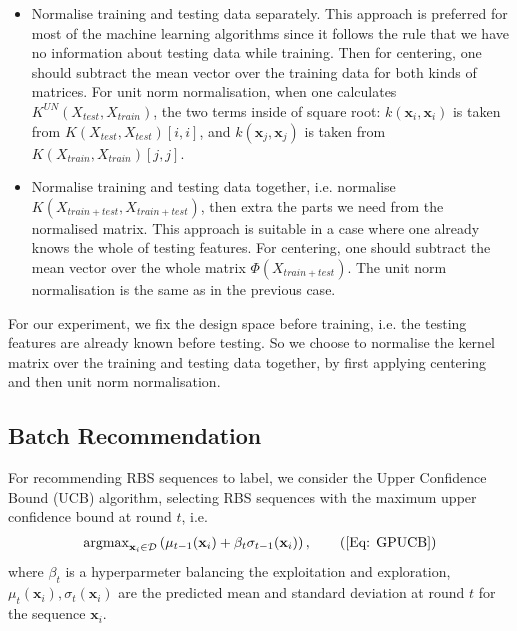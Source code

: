 \begin{itemize}
    \item Normalise training and testing data separately.
    This approach is preferred for most of the machine learning algorithms since it follows the rule that we have no information about testing data while training.
    Then for centering, one should subtract the mean vector over the training data for both kinds of matrices.
    For unit norm normalisation, when one calculates $K^{UN}(X_{test}, X_{train})$, the two terms inside of square root: $k(\mathbf{x}_i, \mathbf{x}_i)$ is taken from $K(X_{test}, X_{test})[i,i]$, and $k(\mathbf{x}_j, \mathbf{x}_j)$ is taken from $K(X_{train}, X_{train})[j,j]$.
    
    \item Normalise training and testing data together, i.e. normalise $K(X_{train+test}, X_{train+test})$, then extra the parts we need from the normalised matrix. 
    This approach is suitable in a case where one already knows the whole of testing features. 
    For centering, one should subtract the mean vector over the whole matrix $\Phi(X_{train+test})$. 
    The unit norm normalisation is the same as in the previous case. 
\end{itemize}

For our experiment, we fix the design space before training, i.e. the testing features are already known before testing. 
So we choose to normalise the kernel matrix over the training and testing data together,
by first applying centering and then unit norm normalisation. 

\subsection{Batch Recommendation}

For recommending RBS sequences to label, we consider the Upper Confidence Bound (UCB) algorithm, 
selecting RBS sequences with the maximum upper confidence bound at round $t$, i.e.
\begin{align}
    \operatorname{argmax}_{\mathbf{x}_i \in \mathcal{D}} \left( \mu_{t-1}(\mathbf{x}_i) + \beta_t \sigma_{t-1}(\mathbf{x}_i)\right),
    \tag{\ref{Eq: GPUCB}}
\end{align}
where $\beta_t$ is a hyperparmeter balancing the exploitation and exploration, 
$\mu_t(\mathbf{x}_i), \sigma_t(\mathbf{x}_i)$ are the predicted mean and standard deviation at round $t$ for the sequence $\mathbf{x}_i$.

